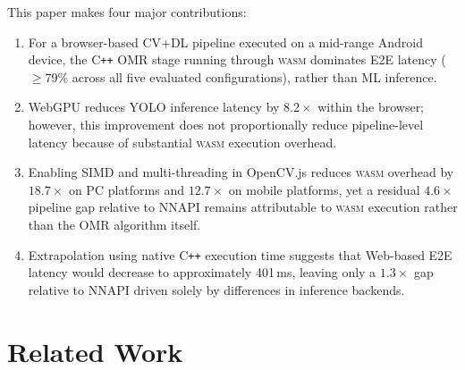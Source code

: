 \documentclass[conference]{IEEEtran}
\newcommand{\wasm}{\textsc{wasm}}
\newcommand{\ms}{\,ms}
\begin{document}
This paper makes four major contributions:
\begin{enumerate}
  \item For a browser-based CV+DL pipeline executed on a mid-range Android device, the C\texttt{++} OMR stage running through \wasm{} dominates E2E latency ($\geq$79\% across all five evaluated configurations), rather than ML inference.
  
  \item WebGPU reduces YOLO inference latency by $8.2\times$ within the browser; however, this improvement does not proportionally reduce pipeline-level latency because of substantial \wasm{} execution overhead.
  
  \item Enabling SIMD and multi-threading in OpenCV.js reduces \wasm{} overhead by $18.7\times$ on PC platforms and $12.7\times$ on mobile platforms, yet a residual $4.6\times$ pipeline gap relative to NNAPI remains attributable to \wasm{} execution rather than the OMR algorithm itself.
  
  \item Extrapolation using native C\texttt{++} execution time suggests that Web-based E2E latency would decrease to approximately 401\ms{}, leaving only a $1.3\times$ gap relative to NNAPI driven solely by differences in inference backends. 
\end{enumerate}
\section{Related Work}


\end{document}

